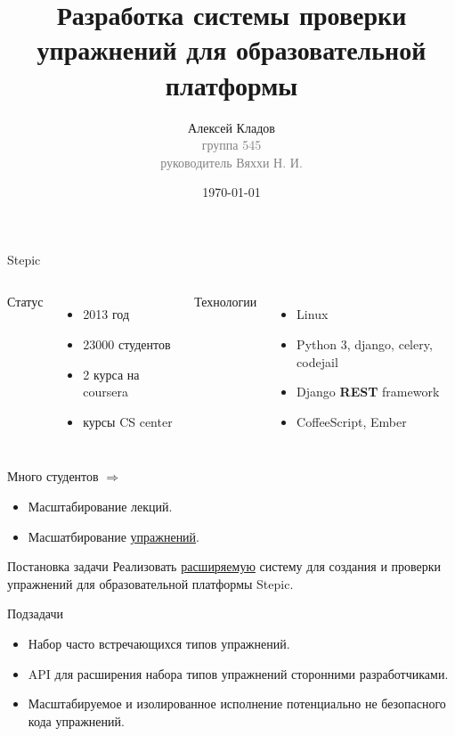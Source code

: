 \documentclass{beamer}
\title[Упражнения в Stepic]{Разработка системы проверки упражнений для
  образовательной платформы}
\author{Алексей Кладов\\
  { \footnotesize \textcolor{gray}{группа 545\\ руководитель Вяххи Н. И.}}}
\institute[СПбГУ]{Санкт-Петербургский государственный университет}
\date{\today} %
\begin{document}


\begin{frame}
\titlepage %
\end{frame}

\begin{frame}{Stepic}
  \begin{columns}[t]
    Статус
    \begin{itemize}
    \item 2013 год
    \item 23000 студентов
    \item 2 курса на coursera
    \item курсы CS center
    \end{itemize}

    Технологии
    \begin{itemize}
    \item Linux
    \item Python 3, django, celery, codejail
    \item Django \textbf{REST} framework
    \item CoffeeScript, Ember
    \end{itemize}
  \end{columns}

  \medskip

  Много студентов $\Rightarrow$
  \begin{itemize}
  \item Масштабирование лекций.
  \item Масшатбирование \underline{упражнений}.
  \end{itemize}
\end{frame}

\begin{frame}{Постановка задачи}
  Реализовать \underline{расширяемую} систему для создания и проверки упражнений
  для образовательной платформы Stepic.

  \medskip

  Подзадачи
  \begin{itemize}
  \item Набор часто встречающихся типов упражнений.
  \item API для расширения набора типов упражнений
    сторонними разработчиками.
  \item Масштабируемое и изолированное исполнение потенциально не
    безопасного кода упражнений.
  \end{itemize}
\end{frame}
\end{document}
